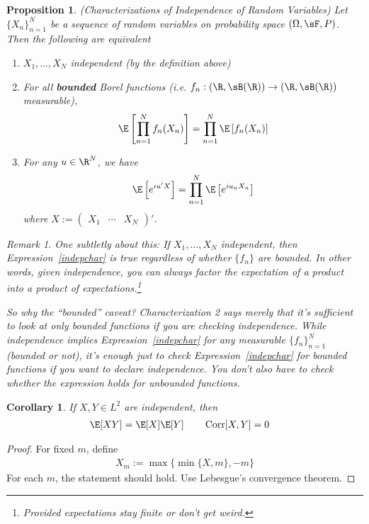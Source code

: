 \documentclass[12pt]{article}
\theoremstyle{plain}
\newtheorem{prop}[thm]{Proposition}
\newtheorem{cor}[thm]{Corollary}
\theoremstyle{definition}
\theoremstyle{remark}
\newtheorem*{rmk}{Remark}
\newcommand{\ra}{\rightarrow}
\newcommand{\Corr}{\operatorname{Corr}}
\newcommand{\nN}{_{n=1}^N}
\begin{document}
\begin{prop}\emph{(Characterizations of Independence of Random Variables)}
Let $\{X_n\}\nN$ be a sequence of random variables on probability space
$(\Omega,\sF,P)$. Then the following are equivalent
\begin{enumerate}
  \item $X_1,\ldots,X_N$ independent (by the definition above)
  \item For all \textbf{bounded} Borel functions (i.e.
    $f_n:(\R,\sB(\R)) \ra (\R,\sB(\R))$ measurable),
    \begin{align}
      \E\left[\prod\nN f_n(X_n)\right]
      =
      \prod\nN \E\left[f_n(X_n)\right]
      \label{indepchar}
    \end{align}
  \item For any $u\in \R^N$, we have
    \begin{align*}
      \E\left[e^{iu' X}\right]
      =
      \prod\nN \E\left[e^{iu_n X_n}\right]
    \end{align*}
    where $X := \begin{pmatrix} X_1 &\cdots & X_N \end{pmatrix}'$.
\end{enumerate}
\begin{rmk}
One subtletly about this:
If $X_1,\ldots,X_N$ independent, then Expression~\ref{indepchar} is true
\emph{regardless} of whether $\{f_n\}$ are bounded.
In other words, given independence, you can \emph{always} factor the
expectation of a product into a product of expectations.\footnote{%
  Provided expectations stay finite or don't get weird.
}

So why the ``bounded'' caveat? Characterization 2 says merely that it's
\emph{sufficient} to look at only bounded functions if you are
\emph{checking} independence. While independence \emph{implies}
Expression~\ref{indepchar} for any measurable $\{f_n\}\nN$
(bounded or not), it's \emph{enough} just to check
Expression~\ref{indepchar} for bounded functions if you want to declare
independence. You don't also have to check whether the expression holds
for unbounded functions.
\end{rmk}
\end{prop}
\begin{cor}
If $X,Y\in L^2$ are independent, then
\begin{align*}
  \E[XY] &= \E[X]\E[Y]
  \qquad
  \Corr[X,Y] = 0
\end{align*}
\end{cor}
\begin{proof}
For fixed $m$, define
\begin{align*}
  X_m := \max\{\min\{X,m\}, -m\}
\end{align*}
For each $m$, the statement should hold. Use Lebesgue's convergence
theorem.
\end{proof}
\end{document}
